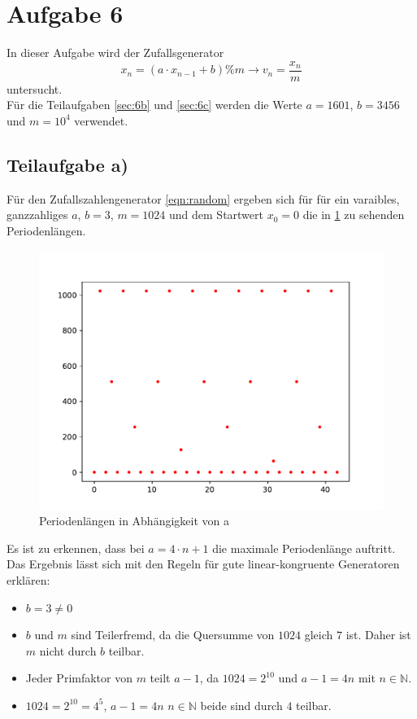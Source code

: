 \section{Aufgabe 6}
In dieser Aufgabe wird der Zufallsgenerator
\begin{equation}
  x_n = (a \cdot x_{n-1} + b) \% m  \rightarrow v_n = \frac{x_n}{m}\label{eqn:random}
\end{equation}
untersucht. \\
Für die Teilaufgaben \ref{sec:6b} und \ref{sec:6c} werden die Werte $a=1601$, $b=3456$ und $m=10^4$ verwendet.
\subsection{Teilaufgabe a)}
Für den Zufallszahlengenerator \eqref{eqn:random} ergeben sich für für ein varaibles, ganzzahliges $a$, $b=3$, $m=1024$
und dem Startwert $x_0=0$ die in \ref{fig:periodenlänge} zu sehenden Periodenlängen.

\begin{figure}[H]
  \includegraphics{Aufgabe06/Teilaufgabe_a).pdf}
  \caption{Periodenlängen in Abhängigkeit von a}
  \label{fig:periodenlänge}
\end{figure}

Es ist zu erkennen, dass bei $a=4 \cdot n + 1 $ die maximale Periodenlänge auftritt.
Das Ergebnis lässt sich mit den Regeln für gute linear-kongruente Generatoren erklären:
\begin{itemize}
  \item $b = 3 \neq 0$
  \item $b$ und $m$ sind Teilerfremd, da die Quersumme von $1024$ gleich $7$ ist. Daher ist $m$ nicht durch $b$ teilbar.
  \item Jeder Primfaktor von $m$ teilt $a-1$, da $1024=2^{10}$ und $a-1=4n$ mit $n \in \mathbb{N}$.
  \item $1024=2^{10}=4^5$, $a-1=4n$ $n \in \mathbb{N}$ \textrightarrow beide sind durch $4$ teilbar.
\end{itemize}

